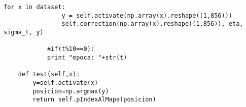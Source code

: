 \begin{lstlisting}[caption=main.py]
            for x in dataset:
                y = self.activate(np.array(x).reshape((1,856)))
                self.correction(np.array(x).reshape((1,856)), eta, sigma_t, y)

            #if(t%10==0):
            print "epoca: "+str(t)

    def test(self,x):
        y=self.activate(x)
        posicion=np.argmax(y)
        return self.pIndexAlMapa(posicion)	
\end{lstlisting}
